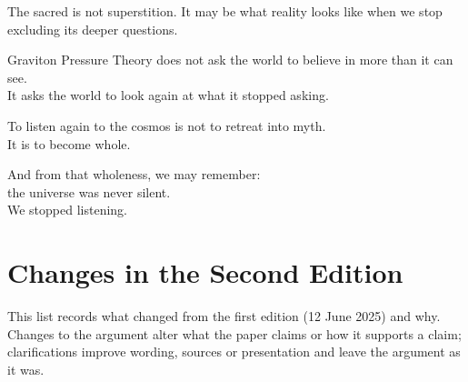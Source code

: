 \documentclass[11pt,a4paper]{article}
\begin{document}
The sacred is not superstition. It may be what reality looks like when we stop excluding its deeper questions.

Graviton Pressure Theory does not ask the world to believe in more than it can see.\\
It asks the world to look again at what it stopped asking.

To listen again to the cosmos is not to retreat into myth.\\
It is to become whole.

And from that wholeness, we may remember:\\
the universe was never silent.\\
We stopped listening.

\clearpage
\section*{Changes in the Second Edition}

This list records what changed from the first edition (12 June 2025) and why. Changes to the argument alter what the paper claims or how it supports a claim; clarifications improve wording, sources or presentation and leave the argument as it was.
\end{document}
